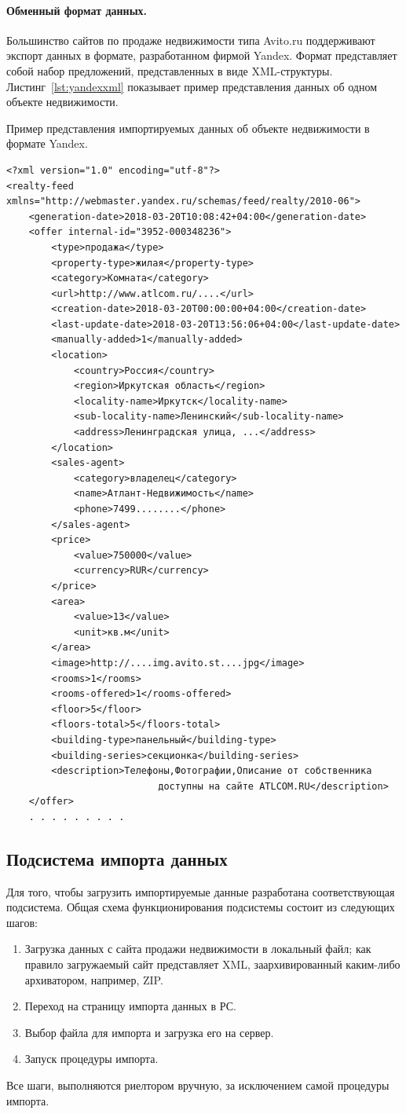 \documentclass[a4paper,14pt,openany,final]{extreport} %
\begin{document}
{\paragraph{Обменный формат данных.}
Большинство сайтов по продаже недвижимости типа Avito.ru поддерживают экспорт данных в формате, разработанном фирмой Yandex. Формат представляет собой набор предложений, представленных в виде XML-структуры. Листинг~\ref{lst:yandexxml} показывает пример представления данных об одном объекте недвижимости.
\begin{pzlisting}
  \caption{Пример представления импортируемых данных об объекте недвижимости в формате Yandex.}
  \label{lst:yandexxml}
\begin{verbatim}
<?xml version="1.0" encoding="utf-8"?>
<realty-feed xmlns="http://webmaster.yandex.ru/schemas/feed/realty/2010-06">
	<generation-date>2018-03-20T10:08:42+04:00</generation-date>
	<offer internal-id="3952-000348236">
		<type>продажа</type>
		<property-type>жилая</property-type>
		<category>Комната</category>
		<url>http://www.atlcom.ru/....</url>
		<creation-date>2018-03-20T00:00:00+04:00</creation-date>
		<last-update-date>2018-03-20T13:56:06+04:00</last-update-date>
		<manually-added>1</manually-added>
		<location>
			<country>Россия</country>
			<region>Иркутская область</region>
			<locality-name>Иркутск</locality-name>
			<sub-locality-name>Ленинский</sub-locality-name>
			<address>Ленинградская улица, ...</address>
		</location>
		<sales-agent>
			<category>владелец</category>
			<name>Атлант-Недвижимость</name>
			<phone>7499........</phone>
		</sales-agent>
		<price>
			<value>750000</value>
			<currency>RUR</currency>
		</price>
		<area>
			<value>13</value>
			<unit>кв.м</unit>
		</area>
		<image>http://....img.avito.st....jpg</image>
		<rooms>1</rooms>
		<rooms-offered>1</rooms-offered>
		<floor>5</floor>
		<floors-total>5</floors-total>
		<building-type>панельный</building-type>
		<building-series>секционка</building-series>
		<description>Телефоны,Фотографии,Описание от собственника
                           доступны на сайте ATLCOM.RU</description>
	</offer>
	. . . . . . . . .
\end{verbatim}
\end{pzlisting}

\subsection{Подсистема импорта данных}
Для того, чтобы загрузить импортируемые данные разработана соответствующая подсистема. Общая схема функционирования подсистемы состоит из следующих шагов:
\begin{enumerate}
\item Загрузка данных с сайта продажи недвижимости в локальный файл; как правило загружаемый сайт представляет XML, заархивированный каким-либо архиватором, например, ZIP.
\item Переход на страницу импорта данных в РС.
\item Выбор файла для импорта и загрузка его на сервер.
\item Запуск процедуры импорта.
\end{enumerate}
Все шаги, выполняются риелтором вручную, за исключением самой процедуры импорта.

}
\end{document}
